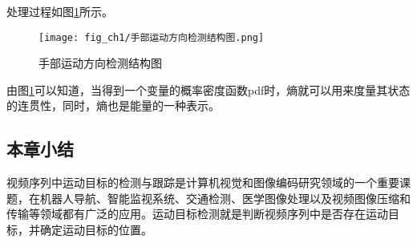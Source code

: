 处理过程如图\ref{fig:手部运动方向检测结构图}所示。
\begin{figure}[H]
  \centering
  \texttt{[image: fig\_ch1/手部运动方向检测结构图.png]}
  \caption{手部运动方向检测结构图}
  \label{fig:手部运动方向检测结构图}
\end{figure}

由图\ref{fig:手部运动方向检测结构图}可以知道，当得到一个变量的概率密度函数pdf时，熵就可以用来度量其状态的连贯性，同时，熵也是能量的一种表示。

\subsection{本章小结}

视频序列中运动目标的检测与跟踪是计算机视觉和图像编码研究领域的一个重要课题，在机器人导航、智能监视系统、交通检测、医学图像处理以及视频图像压缩和传输等领域都有广泛的应用。运动目标检测就是判断视频序列中是否存在运动目标，并确定运动目标的位置。